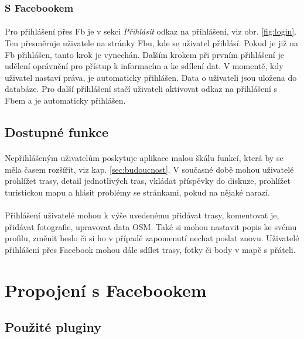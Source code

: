 \documentclass[11pt,a4paper,titlepage,oneside]{book}
\begin{document}
				\subsubsection{S Facebookem} 
					\paragraph{}Pro přihlášení přes \ac{Fb} je v sekci \textit{Přihlásit} odkaz na přihlášení, viz obr. \ref{fig:login}. Ten přesměruje uživatele na stránky \acl{Fb}u, kde se uživatel přihlásí. Pokud je již na \ac{Fb} přihlášen, tanto krok je vynechán. Dalším krokem při prvním přihlášení je udělení oprávnění pro přístup k informacím a ke sdílení dat. V momentě, kdy uživatel nastaví práva, je automaticky přihlášen. Data o uživateli jsou uložena do databáze. Pro další přihlášení stačí uživateli aktivovat odkaz na přihlášení s \acl{Fb}em a je automaticky přihlášen.

			\subsection{Dostupné funkce}
				\label{sec:funkce}
				\paragraph{} Nepřihlášeným uživatelům poskytuje aplikace malou škálu funkcí, která by se měla časem rozšířit, viz kap. \ref{sec:budoucnost}. V současné době mohou uživatelé prohlížet trasy, detail jednotlivých tras, vkládat příspěvky do diskuze, prohlížet turistickou mapu a hlásit problémy se stránkami, pokud na nějaké narazí.
				\paragraph{} Přihlášení uživatelé mohou k výše uvedenému přidávat trasy, komentovat je, přidávat fotografie, upravovat data \acl{OSM}. Také si mohou nastavit popis ke svému profilu, změnit heslo či si ho v případě zapomenutí nechat poslat znovu. Uživatelé přihlášení přes Facebook mohou dále sdílet trasy, fotky či body v mapě s přáteli.

		\section{Propojení s Facebookem}
			\subsection{Použité pluginy}
\end{document}
